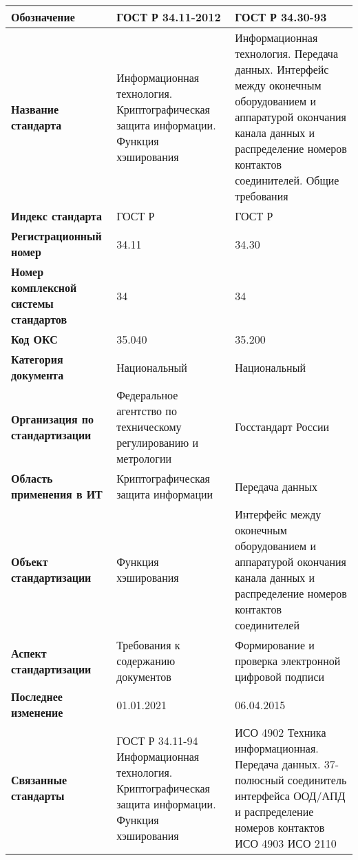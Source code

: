 \begin{table}[h!tp]
	\small
	\centering
	\caption{}
	\label{table:national}
	\begin{tabular}{|p{10em}|p{14em}|p{14em}|}
		\hline
		\textbf{Обозначение}
			& \textbf{ГОСТ Р 34.11-2012} & \textbf{ГОСТ Р 34.30-93} \\ \hline
		\textbf{Название стандарта}
			& Информационная технология. Криптографическая защита информации. Функция хэширования
			& Информационная технология. Передача данных. Интерфейс между оконечным оборудованием и аппаратурой окончания канала данных и распределение номеров контактов соединителей. Общие требования \\ \hline
		\textbf{Индекс стандарта}
			& ГОСТ Р & ГОСТ Р \\ \hline
		\textbf{Регистрационный номер}
			& 34.11 & 34.30 \\ \hline
		\textbf{Номер комплексной системы стандартов}
			& 34 & 34 \\ \hline
		\textbf{Код ОКС}
			& 35.040 & 35.200 \\ \hline
		\textbf{Категория документа}
			& Национальный & Национальный \\ \hline
		\textbf{Организация по стандартизации}
			& Федеральное агентство по техническому регулированию и метрологии
			& Госстандарт России  \\ \hline
		\textbf{Область применения в ИТ}
			& Криптографическая защита информации
			& Передача данных \\ \hline
		\textbf{Объект стандартизации}
			& Функция хэширования
			& Интерфейс между оконечным оборудованием и аппаратурой окончания канала данных и распределение номеров контактов соединителей \\ \hline
		\textbf{Аспект стандартизации}
			& Требования к содержанию документов
			& Формирование и проверка электронной цифровой подписи \\ \hline
		\textbf{Последнее изменение}
			& 01.01.2021 & 06.04.2015 \\ \hline
		\textbf{Связанные стандарты}
			& ГОСТ Р 34.11-94 Информационная технология. Криптографическая защита информации. Функция хэширования
			& ИСО 4902 Техника информационная. Передача данных. 37-полюсный соединитель интерфейса ООД/АПД и распределение номеров контактов ИСО 4903  ИСО 2110 \\ \hline
	\end{tabular}
\end{table}

